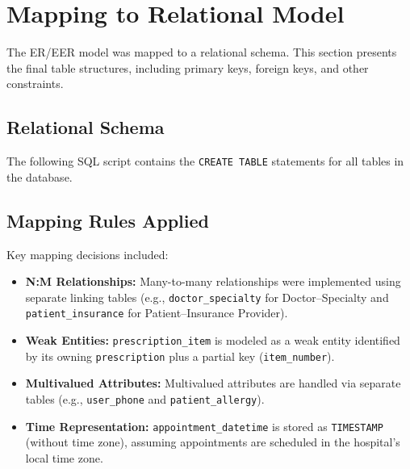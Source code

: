 \section{Mapping to Relational Model}
The ER/EER model was mapped to a relational schema. This section presents the final table structures, including primary keys, foreign keys, and other constraints.

\subsection{Relational Schema}
The following SQL script contains the \texttt{CREATE TABLE} statements for all tables in the database.



\subsection{Mapping Rules Applied}
Key mapping decisions included:
\begin{itemize}
    \item \textbf{N:M Relationships:} Many-to-many relationships were implemented using separate linking tables (e.g., \texttt{doctor\_specialty} for Doctor--Specialty and \texttt{patient\_insurance} for Patient--Insurance Provider).
    \item \textbf{Weak Entities:} \texttt{prescription\_item} is modeled as a weak entity identified by its owning \texttt{prescription} plus a partial key (\texttt{item\_number}).
    \item \textbf{Multivalued Attributes:} Multivalued attributes are handled via separate tables (e.g., \texttt{user\_phone} and \texttt{patient\_allergy}).
    \item \textbf{Time Representation:} \texttt{appointment\_datetime} is stored as \texttt{TIMESTAMP} (without time zone), assuming appointments are scheduled in the hospital's local time zone.
\end{itemize}
